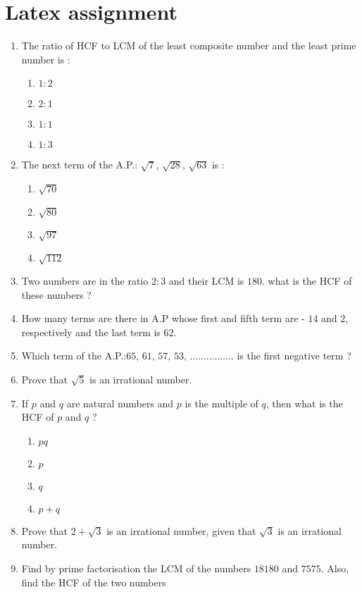 \documentclass[12pt]{article}
\begin{document}
\section*{\center Latex assignment}
\begin{enumerate}
    \item  The ratio of HCF to LCM of the least composite number and the least prime number is :
    \begin{enumerate}[label=(\alph*)]
      \item $1:2$
      \item $2:1$
      \item $1:1$
      \item $1:3$
    \end{enumerate}
    \item The next term of the A.P.: $\sqrt{7}$, $\sqrt{28}$, $\sqrt{63}$ is :
    \begin{enumerate}[label=(\alph*)]
      \item $\sqrt{70}$
      \item $\sqrt{80}$
      \item $\sqrt{97}$
      \item $\sqrt{112}$
    \end{enumerate}
    \item Two numbers are in the ratio $2:3$ and their LCM is $180$. what is the HCF of these numbers ?
    \item How many terms are there in A.P whose first and fifth term are - $14$ and $2$, respectively and the last term is $62$.
    \item Which term of the A.P.:$65$, $61$, $57$, $53$, ................ is the first negative term ?
    \item Prove that $\sqrt{5}$ is an irrational number.
    \item If $p$ and $q$ are natural numbers and $p$ is the multiple of  $q$, then what is the HCF of $p$ and $q$ ?
    \begin{enumerate}[label=(\alph*)]
      \item $pq$
      \item $p$
      \item $q$
      \item $p+q$
      \end{enumerate}
    \item Prove that $2+\sqrt{3}$ is an irrational number, given that $\sqrt{3}$ is an irrational number.
        \item Find by prime factorisation the LCM of the numbers $18180$ and $7575$. Also, find the HCF of the two numbers

\end{enumerate}
\end{document}
